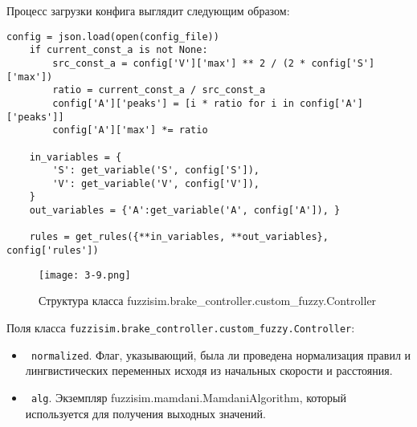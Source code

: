 Процесс загрузки конфига выглядит следующим образом:
\begin{lstlisting}[style=pythonstyle,caption={  }, label=lst:func:1]
config = json.load(open(config_file))
	if current_const_a is not None:
		src_const_a = config['V']['max'] ** 2 / (2 * config['S']['max'])
		ratio = current_const_a / src_const_a
		config['A']['peaks'] = [i * ratio for i in config['A']['peaks']]
		config['A']['max'] *= ratio

	in_variables = {
		'S': get_variable('S', config['S']),
		'V': get_variable('V', config['V']),
	}
	out_variables = {'A':get_variable('A', config['A']), }

	rules = get_rules({**in_variables, **out_variables}, config['rules'])
\end{lstlisting}


\begin{figure}[ht]
	\centering
	\texttt{[image: 3-9.png]}
	\caption{ Структура класса fuzzisim.brake\_controller.custom\_fuzzy.Controller}
\end{figure}

Поля класса \lstinline!fuzzisim.brake_controller.custom_fuzzy.Controller!:
\begin{itemize}
	\item \lstinline! normalized!. Флаг, указывающий, была ли проведена нормализация правил и  лингвистических переменных исходя из начальных скорости и расстояния.
	\item \lstinline! alg!. Экземпляр fuzzisim.mamdani.MamdaniAlgorithm, который используется для получения выходных значений.
\end{itemize}


